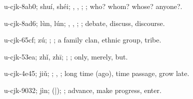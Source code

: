 \begin{multicols}{2}
{\cjkgGlue{}u-cjk-8ab0; shuí, shéi; \cjkgGlue{}, \cjkgGlue{}, \cjkgGlue{}; \cjkgGlue{}; who? whom? whose? anyone?.

\cjkgGlue{}u-cjk-8ad6; lùn, lún; \cjkgGlue{}, \cjkgGlue{}, \cjkgGlue{}; \cjkgGlue{}; debate, discuss, discourse.

\cjkgGlue{}u-cjk-65cf; zú; \cjkgGlue{}; \cjkgGlue{}; a family clan, ethnic group, tribe.

\cjkgGlue{}u-cjk-53ea; zhǐ, zhī; \cjkgGlue{}; \cjkgGlue{}; only, merely, but.

\cjkgGlue{}u-cjk-4e45; jiǔ; \cjkgGlue{}\cjkgGlue{}\cjkgGlue{}; \cjkgGlue{}, \cjkgGlue{}; long time (ago), time passage, grow late.

\cjkgGlue{}u-cjk-9032; jìn; \cjkgGlue{}\cjkgGlue{}(\cjkgGlue{}|\cjkgGlue{}); \cjkgGlue{}; advance, make progress, enter.

}
\end{multicols}
